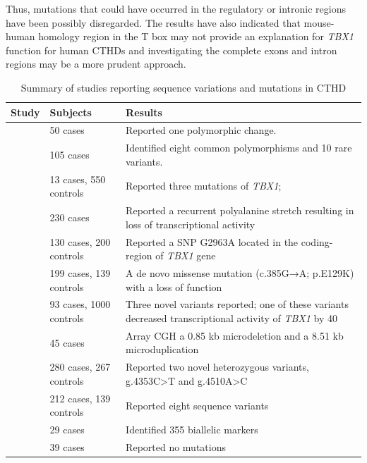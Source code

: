 \begin{refsection}
Thus, mutations that could have occurred in the regulatory or intronic regions have been possibly disregarded. The results have also indicated that mouse-human homology region in the T box may not provide an explanation for \textit{TBX1} function for human CTHDs and investigating the complete exons and intron regions may be a more prudent approach. 

\begin{landscape}
\begin{table}[!hp]
\centering
\caption[Summary of studies reporting sequence variations and mutations in CTHD]{Summary of studies reporting sequence variations and mutations in CTHD}
\label{tab:4.2summary}
\begin{tabular}{  l  l  l  }
\toprule
	\textbf{Study} & \textbf{Subjects} & \textbf{Results} \\ \toprule
	\cite{Cabuk2007} & 50 cases & Reported one polymorphic change. \\ \midrule
	\cite{gong2001mutation} & 105 cases & Identified eight common polymorphisms and 10 rare variants. \\ \midrule
	\cite{yagi2003role} & 13 cases, 550 controls & Reported three mutations of \textit{TBX1}; \\ \midrule
	\cite{rauch2004assessment} & 230 cases & Reported a recurrent polyalanine stretch resulting in loss of transcriptional activity \\ \midrule
	\cite{han2006single} & 130 cases, 200 controls & Reported a SNP G2963A located in the coding-region of \textit{TBX1} gene \\ \midrule
	\cite{xu2014novel} & 199 cases, 139 controls & A de novo missense mutation (c.385G→A; p.E129K) with a loss of function \\ \midrule
	\cite{griffin2010systematic} & 93 cases, 1000 controls & Three novel variants reported; one of these variants decreased transcriptional activity  of \textit{TBX1} by 40 \\ \midrule
	\cite{chen2014microdeletions} & 45 cases & Array CGH a 0.85 kb microdeletion and a 8.51 kb microduplication \\ \midrule
	\cite{wang2012genetic} & 280 cases, 267 controls & Reported two novel heterozygous variants, g.4353C>T and g.4510A>C \\ \midrule
	\cite{xu2011detecting} & 212 cases, 139 controls & Reported eight sequence variants \\ \midrule
	\cite{heike2010single} & 29 cases & Identified 355 biallelic markers \\ \midrule
	\cite{voelckel2004allelic} & 39 cases & Reported no mutations \\ \bottomrule
\end{tabular}
\end{table}
\end{landscape}


\end{refsection}
